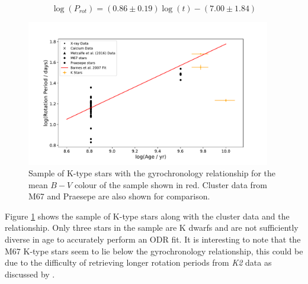 \begin{equation}
    \log(P_{rot}) = (0.86 \pm 0.19)\log(t) - (7.00 \pm 1.84)
    \label{Eq:g_stars_ODR}
\end{equation}

\begin{figure}[h!]
    \centering
    \includegraphics[width=0.95\textwidth]{Figures/5-Activity_rotation/k_prot_v_age.pdf}
    \caption[Rotation period as a function of age for K-type stars]{Sample of K-type stars with the \citet{Barnes_2007} gyrochronology relationship for the mean $B-V$ colour of the sample shown in red. Cluster data from M67 and Praesepe are also shown for comparison.}
    \label{fig:k_prot_v_age}
\end{figure}

Figure \ref{fig:k_prot_v_age} shows the sample of K-type stars along with the cluster data and the \citet{Barnes_2007} relationship. Only three stars in the sample are K dwarfs and are not sufficiently diverse in age to accurately perform an ODR fit. It is interesting to note that the M67 K-type stars seem to lie below the gyrochronology relationship, this could be due to the difficulty of retrieving longer rotation periods from \textit{K2} data as discussed by \citet{Esselstein_etal_2018}.

